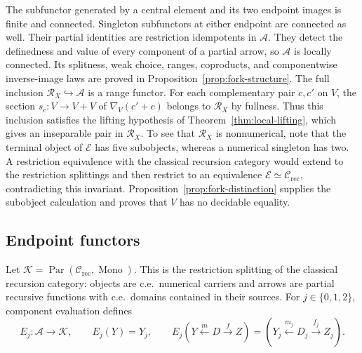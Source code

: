 \documentclass[11pt]{article}
\begin{document}
The subfunctor generated by a central element and its two endpoint
images is finite and connected. Singleton subfunctors at either endpoint
are connected as well. Their partial identities are restriction
idempotents in $\mathcal A$. They detect the definedness and value
of every component of a partial arrow, so $\mathcal A$ is locally
connected. Its splitness, weak choice, ranges, coproducts, and
componentwise inverse-image laws are proved in
Proposition~\ref{prop:fork-structure}.
The full inclusion $\mathscr R_X\hookrightarrow\mathcal A$ is a
range functor.
For each complementary pair $c,c'$ on $V$, the section
$s_c:V\to V+V$ of $\nabla_V(c'+c)$ belongs to $\mathscr R_X$
by fullness. Thus this inclusion satisfies the lifting hypothesis of
Theorem~\ref{thm:local-lifting}, which gives an inseparable pair in
$\mathscr R_X$.
To see that $\mathscr R_X$ is nonnumerical, note that the terminal
object of $\mathcal E$ has five subobjects,
whereas a numerical singleton has two.
A restriction equivalence with the classical recursion category
would extend to the restriction splittings and then restrict to an
equivalence $\mathcal E\simeq\mathcal C_{\mathrm{rec}}$, contradicting
this invariant. Proposition~\ref{prop:fork-distinction} supplies the
subobject calculation and proves that $V$ has no decidable equality.

\subsection{Endpoint functors}

Let
$\mathcal K=\operatorname{Par}(\mathcal C_{\mathrm{rec}},\operatorname{Mono})$.
This is the restriction splitting of the classical recursion category:
objects are c.e.\ numerical carriers and arrows are partial recursive
functions with c.e.\ domains contained in their sources.
For $j\in\{0,1,2\}$, component evaluation defines
\begin{equation}\label{eq:endpoint-functor}
 E_j:\mathcal A\longrightarrow\mathcal K,\qquad
 E_j(Y)=Y_j,\qquad
 E_j(Y\xleftarrow{m}D\xrightarrow{f}Z)
   =(Y_j\xleftarrow{m_j}D_j\xrightarrow{f_j}Z_j).
\end{equation}
\end{document}
